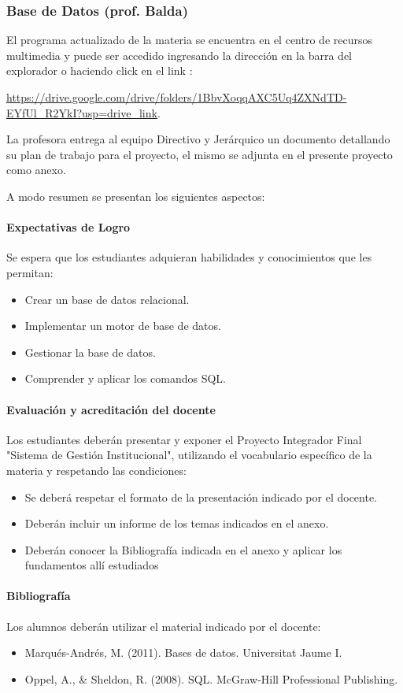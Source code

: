 \subsubsection{Base de Datos (prof. Balda)}       

El programa actualizado de la materia se encuentra en el centro de recursos multimedia y puede ser accedido ingresando la dirección en la barra del explorador o haciendo click en el link :

\url{https://drive.google.com/drive/folders/1BbvXoqqAXC5Uq4ZXNdTD-EYfUl_R2YkI?usp=drive_link}.

La profesora entrega al equipo Directivo y Jerárquico un documento detallando su plan de trabajo para el proyecto, el mismo se adjunta en el presente proyecto como anexo.

A modo resumen se presentan los siguientes aspectos:
\paragraph{Expectativas de Logro}
Se espera que los estudiantes adquieran habilidades y conocimientos que les permitan: 
\begin{itemize}
    \item Crear un base de datos relacional.
    \item Implementar un motor de base de datos.
    \item Gestionar la base de datos.
    \item Comprender y aplicar los comandos SQL. 
\end{itemize}


\paragraph{Evaluación y acreditación del docente}
Los estudiantes deberán presentar y exponer el Proyecto Integrador Final "Sistema de Gestión Institucional", utilizando el vocabulario específico de la materia y respetando las condiciones:
\begin{itemize}
    \item Se deberá respetar el formato de la presentación indicado por el docente.
    \item Deberán incluir un informe de los temas indicados en el anexo.
    \item Deberán conocer la Bibliografía indicada en el anexo y aplicar los fundamentos allí estudiados
\end{itemize}
\paragraph{Bibliografía} Los alumnos deberán utilizar el material indicado por el docente:
\begin{itemize}
    \item Marqués-Andrés, M. (2011). Bases de datos. Universitat Jaume I.
    \item  Oppel, A., \& Sheldon, R. (2008). SQL. McGraw-Hill Professional Publishing.
\end{itemize}